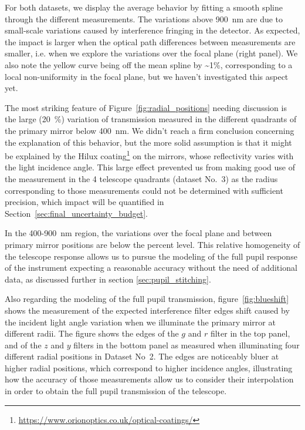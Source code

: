 For both datasets, we display the average behavior by fitting a smooth spline through the different measurements. The variations above \SI{900}{\nano\meter} are due to small-scale variations caused by interference fringing in the detector. As expected, the impact is larger when the optical path differences between measurements are smaller, i.e. when we explore the variations over the focal plane (right panel). We also note the yellow curve being off the mean spline by \textasciitilde 1\%, corresponding to a local non-uniformity in the focal plane, but we haven't investigated this aspect yet. 

The most striking feature of Figure~\ref{fig:radial_positions} needing discussion is the large (\SI{20}{\%}) variation of transmission measured in the different quadrants of the primary mirror below \SI{400}{\nano\meter}. We didn't reach a firm conclusion concerning the explanation of this behavior, but the more solid assumption is that it might be explained by the Hilux coating\footnote{\url{https://www.orionoptics.co.uk/optical-coatings/}} on the \SD mirrors, whose reflectivity varies with the light incidence angle. This large effect prevented us from making good use of the measurement in the 4 telescope quadrants (dataset No.~3) as the radius corresponding to those measurements could not be determined with sufficient precision, which impact will be quantified in Section~\ref{sec:final_uncertainty_budget}.

In the 400-\SI{900}{\nano\meter} region, the variations over the focal plane and
between primary mirror positions are below the percent level. This relative
homogeneity of the telescope response allows us to pursue the modeling of the full
pupil response of the instrument expecting a reasonable accuracy without the
need of additional data, as discussed further in section \ref{sec:pupil_stitching}.

Also regarding the modeling of the full pupil transmission,
figure~\ref{fig:blueshift} shows the measurement of the expected interference
filter edges shift caused by the incident light angle variation when we
illuminate the primary mirror at different radii. The figure shows the edges of
the $g$ and $r$ filter in the top panel, and of the $z$ and $y$ filters in the
bottom panel as measured when illuminating four different radial positions in
Dataset No~2. The edges are noticeably bluer at higher radial positions, which
correspond to higher incidence angles, illustrating how the accuracy of those
measurements allow us to consider their interpolation in order to obtain the full
pupil transmission of the telescope.

